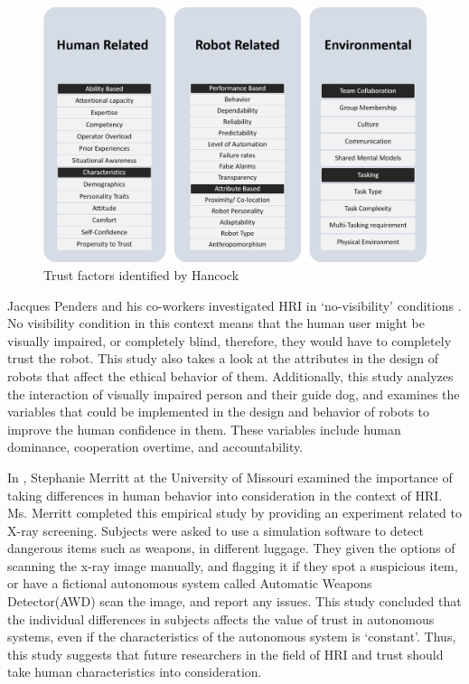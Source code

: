 \documentclass[runningheads,a4paper]{llncs}
\begin{document}
\begin{figure}
	\centering
		\includegraphics[width=\textwidth]{Figures/TrustFactors.png}
	\caption{Trust factors identified by Hancock \cite{hancock2011meta}}
\end{figure}

\newpage

Jacques Penders and his co-workers investigated HRI in `no-visibility' conditions \cite{penders2013enhancing}. No visibility condition in this context means that the human user might be visually impaired, or completely blind, therefore, they would have to completely trust the robot. This study also takes a look at the attributes in the design of robots that affect the ethical behavior of them. Additionally, this study analyzes the interaction of visually impaired person and their guide dog, and examines the variables that could be implemented in the design and behavior of robots to improve the human confidence in them. These variables include human dominance, cooperation overtime, and accountability.

In \cite{merritt2008not}, Stephanie Merritt at the University of Missouri examined the importance of taking differences in human behavior into consideration in the context of HRI. Ms. Merritt completed this empirical study by providing an experiment related to  X-ray screening. Subjects were asked to use a simulation software to detect dangerous items such as weapons, in different luggage. They given the options of scanning the x-ray image manually, and flagging it if they spot a suspicious item, or have a fictional autonomous system called  Automatic Weapons Detector(AWD) scan the image, and report any issues. This study concluded that the individual differences in subjects affects the value of trust in autonomous systems, even if the characteristics of the autonomous system is `constant'. Thus, this study suggests that future researchers in the field of HRI and trust should take human characteristics into consideration.
\end{document}
